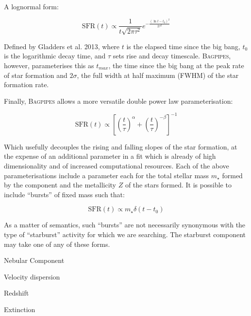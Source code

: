 \documentclass[a4paper,11pt]{article}
\begin{document}
\noindent A lognormal form:

\begin{equation}
  \mathrm{SFR}(t) \propto
  \frac{1}{t\sqrt{2\pi\tau^2}}
  e^{-\frac{\left(\ln{t-t_0}\right)^2}{2\tau^2}}
\end{equation}

\noindent Defined by Gladders et al. 2013, where $t$ is the elapsed time since the big bang, $t_0$ is the logarithmic decay time, and $\tau$ sets rise and decay timescale.\cite{Gladders_2013} \textsc{Bagpipes}, however, parameterises this as $t_{max}$, the time since the big bang at the peak rate of star formation and $2\sigma$, the full width at half maximum (FWHM) of the star formation rate.\cite{Carnall_2018}

Finally, \textsc{Bagpipes} allows a more versatile double power law parameterisation:

\begin{equation}
  \mathrm{SFR}(t)\propto
  \left[
  \left(\frac{t}{\tau}\right)^{\alpha} +
  \left(\frac{t}{\tau}\right)^{-\beta}
  \right]
  ^{-1}
\end{equation}

\noindent Which usefully decouples the rising and falling slopes of the star formation, at the expense of an additional parameter in a fit which is already of high dimensionality and of increased computational resources.\cite{Carnall_2018} Each of the above parameterisations include a parameter each for the total stellar mass $m_\star$ formed by the component and the metallicity $Z$ of the stars formed. It is possible to include ``bursts'' of fixed mass such that:

\begin{equation}
  \mathrm{SFR}(t)\propto
  m_\star \delta(t-t_0)
\end{equation}

\noindent As a matter of semantics, such ``bursts'' are not necessarily synonymous with the type of ``starburst'' activity for which we are searching. The starburst component may take one of any of these forms.

Nebular Component

Velocity dispersion

Redshift

Extinction
\end{document}
